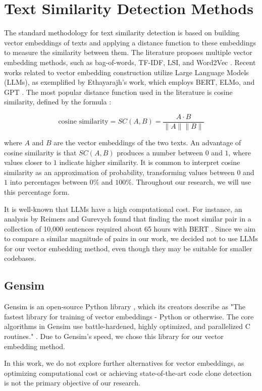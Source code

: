 \en

\section{Text Similarity Detection Methods}
\label{sec:similarity}

The standard methodology for text similarity detection is based on building
vector embeddings of texts and applying a distance function to these embeddings
to measure the similarity between them. The literature proposes multiple vector
embedding methods, such as bag-of-words, TF-IDF, LSI, and Word2Vec
\citep{gensimlivro}. Recent works related to vector embedding construction
utilize Large Language Models (LLMs), as exemplified by Ethayarajh's work,
which employs BERT, ELMo, and GPT \citep{llmsimilar}. The most popular distance
function used in the literature is cosine similarity, defined by the formula
\citep{cosineref}:

$$\text{cosine similarity} = SC(A,B) = \frac{ A \cdot B}{ \lVert A \rVert \lVert B \rVert }$$

where $A$ and $B$ are the vector embeddings of the two texts. An advantage of
cosine similarity is that $SC(A,B)$ produces a number between $0$ and $1$,
where values closer to $1$ indicate higher similarity. It is common to
interpret cosine similarity as an approximation of probability, transforming
values between $0$ and $1$ into percentages between $0\%$ and $100\%$.
Throughout our research, we will use this percentage form.

It is well-known that LLMs have a high computational cost. For instance, an
analysis by Reimers and Gurevych found that finding the most similar pair in a
collection of 10,000 sentences required about 65 hours with BERT
\citep{bertsimilar}. Since we aim to compare a similar magnitude of pairs in
our work, we decided not to use LLMs for our vector embedding method, even
though they may be suitable for smaller codebases.

\subsection{Gensim}

Gensim is an open-source Python library \citep{gensim}, which its creators
describe as "The fastest library for training of vector embeddings - Python or
otherwise. The core algorithms in Gensim use battle-hardened, highly optimized,
and parallelized C routines." \citep{gensimsite}. Due to Gensim's speed, we
chose this library for our vector embedding method.

In this work, we do not explore further alternatives for vector embeddings, as
optimizing computational cost or achieving state-of-the-art code clone
detection is not the primary objective of our research.

